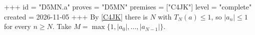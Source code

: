 +++
id = "D5MN.a"
proves = "D5MN"
premises = ["C4JK"]
level = "complete"
created = 2026-11-05
+++
By \ref{C4JK} there is $N$ with $T_N(a) \le 1$, so $|a_n| \le 1$ for every $n \ge N$. Take $M = \max\{1, |a_0|, \dots, |a_{N-1}|\}$.
